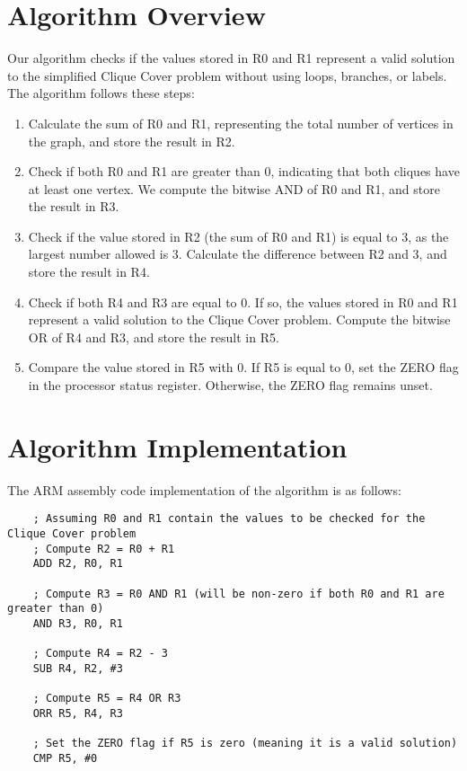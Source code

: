 \section{Algorithm Overview}

Our algorithm checks if the values stored in R0 and R1 represent a valid solution to the simplified Clique Cover problem without using loops, branches, or labels. The algorithm follows these steps:

\begin{enumerate}
    \item Calculate the sum of R0 and R1, representing the total number of vertices in the graph, and store the result in R2.
    \item Check if both R0 and R1 are greater than 0, indicating that both cliques have at least one vertex. We compute the bitwise AND of R0 and R1, and store the result in R3.
    \item Check if the value stored in R2 (the sum of R0 and R1) is equal to 3, as the largest number allowed is 3. Calculate the difference between R2 and 3, and store the result in R4.
    \item Check if both R4 and R3 are equal to 0. If so, the values stored in R0 and R1 represent a valid solution to the Clique Cover problem. Compute the bitwise OR of R4 and R3, and store the result in R5.
    \item Compare the value stored in R5 with 0. If R5 is equal to 0, set the ZERO flag in the processor status register. Otherwise, the ZERO flag remains unset.
\end{enumerate}

\section{Algorithm Implementation}

The ARM assembly code implementation of the algorithm is as follows:

\begin{verbatim}
    ; Assuming R0 and R1 contain the values to be checked for the Clique Cover problem
    ; Compute R2 = R0 + R1
    ADD R2, R0, R1

    ; Compute R3 = R0 AND R1 (will be non-zero if both R0 and R1 are greater than 0)
    AND R3, R0, R1

    ; Compute R4 = R2 - 3
    SUB R4, R2, #3

    ; Compute R5 = R4 OR R3
    ORR R5, R4, R3

    ; Set the ZERO flag if R5 is zero (meaning it is a valid solution)
    CMP R5, #0
\end{verbatim}

